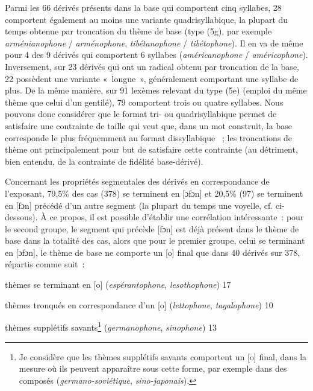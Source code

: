 \documentclass[output=paper]{langsci/langscibook}
\begin{document}
Parmi les 66 dérivés présents dans la base qui comportent cinq syllabes,
28 comportent également au moins une variante quadrisyllabique, la
plupart du temps obtenue par troncation du thème de base (type (5g), par
exemple \emph{arménianophone} / \emph{arménophone}, \emph{tibétanophone}
/ \emph{tibétophone}). Il en va de même pour 4 des 9 dérivés qui
comportent 6 syllabes (\emph{américanophone} / \emph{américophone}).
Inversement, sur 23 dérivés qui ont un radical obtenu par troncation de
la base, 22 possèdent une variante «~longue~», généralement comportant une
syllabe de plus. De la même manière, sur 91 lexèmes relevant du type
(5e) (emploi du même thème que celui d'un gentilé), 79 comportent trois
ou quatre syllabes. Nous pouvons donc considérer que le format tri- ou
quadrisyllabique permet de satisfaire une contrainte de taille qui veut
que, dans un mot construit, la base corresponde le plus fréquemment au
format dissyllabique %
\citep[cf.][]{Plenat09}%
%
~; les troncations de thème ont
principalement pour but de satisfaire cette contrainte (au détriment,
bien entendu, de la contrainte de fidélité base-dérivé).

Concernant les propriétés segmentales des dérivés en correspondance de
l'exposant, 79,5\% des cas (378) se terminent en {[}ɔfɔn{]} et 20,5\%
(97) se terminent en {[}fɔn{]} précédé d'un autre segment (la plupart du
temps une voyelle, cf. ci-dessous). À ce propos, il est possible
d'établir une corrélation intéressante~: pour le second groupe, le
segment qui précède {[}fɔn{]} est déjà présent dans le thème de base
dans la totalité des cas, alors que pour le premier groupe, celui se
terminant en {[}ɔfɔn{]}, le thème de base ne comporte un {[}o{]} final
que dans 40 dérivés sur 378, répartis comme suit~:

\ea\label{ex:montermini:6}

  \ea thèmes se terminant en {[}o{]} (\emph{espérantophone},
\emph{lesothophone}) 17

  \ex thèmes tronqués en correspondance d'un {[}o{]} (\emph{lettophone},
\emph{tagalophone}) 10

  \ex thèmes supplétifs savants\footnote{Je considère que les thèmes
  supplétifs savants comportent un {[}o{]} final, dans la mesure où ils
  peuvent apparaître sous cette forme, par exemple dans des composés
  (\emph{germano-soviétique}, \emph{sino-japonais}).}
(\emph{germanophone}, \emph{sinophone}) 13
\z\z
\end{document}
